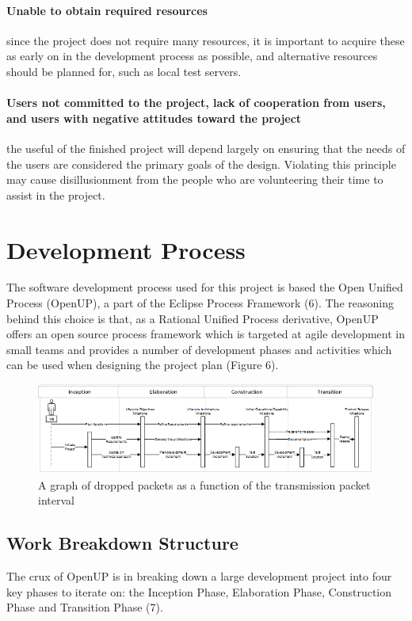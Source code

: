 \documentclass[12pt,a4paper]{article}
\begin{document}
\paragraph{Unable to obtain required resources} since the project does not require many
resources, it is important to acquire these as early on in the development
process as possible, and alternative resources should be planned for, such as
local test servers.


\paragraph{Users not committed to the project, lack of cooperation from users,
  and users with negative attitudes toward the project} the useful of the
finished project will depend largely on ensuring that the needs of the users are
considered the primary goals of the design. Violating this principle may cause
disillusionment from the people who are volunteering their time to assist in the
project.

\section{Development Process}

The software development process used for this project is based the Open Unified
Process (OpenUP), a part of the Eclipse Process Framework (6). The reasoning
behind this choice is that, as a Rational Unified Process derivative, OpenUP
offers an open source process framework which is targeted at agile development
in small teams and provides a number of development phases and activities which
can be used when designing the project plan (Figure 6).

\begin{figure}[H]
\centering
\includegraphics{assets/sequence-openup.png}
\caption{A graph of dropped packets as a function of the transmission packet
  interval}
\label{fig:graph-interval-dropped}
\end{figure}

\subsection{Work Breakdown Structure}
The crux of OpenUP is in breaking down a large development project into four key
phases to iterate on: the Inception Phase, Elaboration Phase, Construction Phase
and Transition Phase (7).
\end{document}

